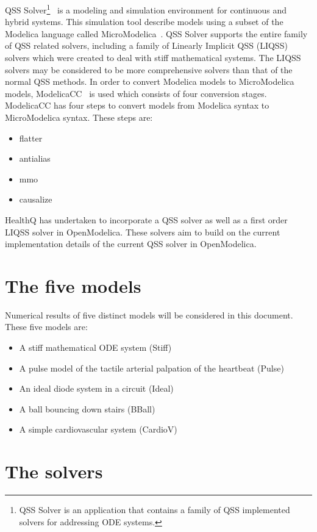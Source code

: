 \documentclass[10pt]{article}
\begin{document}
QSS Solver\footnote{QSS Solver is an application that contains a family of QSS implemented solvers for addressing ODE systems.}~\cite{qss} is a modeling and simulation environment for continuous and hybrid systems. This simulation tool describe models using a subset of the Modelica language called MicroModelica~\cite{micro}. QSS Solver supports the entire family of QSS related solvers, including a family of Linearly Implicit QSS (LIQSS)~\cite{MigoniKofman2009} solvers which were created to deal with stiff mathematical systems. The LIQSS solvers may be considered to be more comprehensive solvers than that of the normal QSS methods. In order to convert Modelica models to MicroModelica models, ModelicaCC~\cite{ModelicaCC} is used which consists of four conversion stages. ModelicaCC has four steps to convert models from Modelica syntax to MicroModelica syntax. These steps are:
\begin{itemize}
 \item flatter
 \item antialias
 \item mmo
 \item causalize
\end{itemize}


HealthQ has undertaken to incorporate a QSS solver as well as a first order LIQSS solver in OpenModelica. These solvers aim to build on the current implementation details of the current QSS solver in OpenModelica.

\section{The five models}

Numerical results of five distinct models will be considered in this document. These five models are:
\begin{itemize}
 \item A stiff mathematical ODE system (Stiff)
 \item A pulse model of the tactile arterial palpation of the heartbeat (Pulse)
 \item An ideal diode system in a circuit (Ideal)
 \item A ball bouncing down stairs (BBall)
 \item A simple cardiovascular system (CardioV)
\end{itemize}

\section{The solvers}
\end{document}
